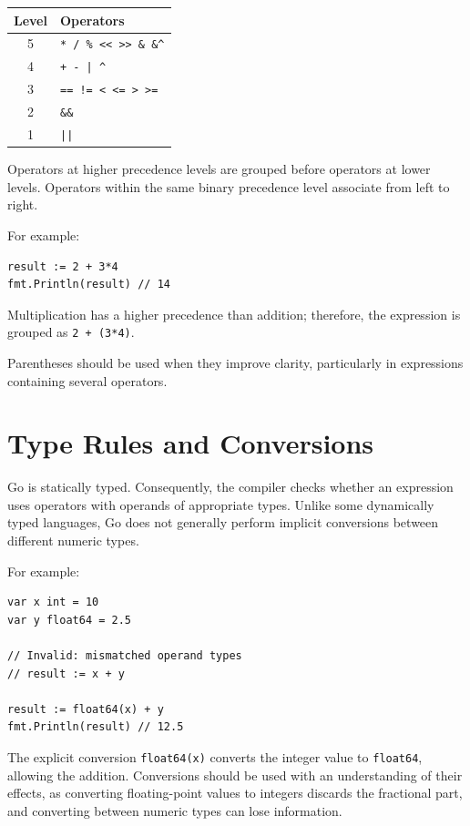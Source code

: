 \begin{center}
\begin{tabular}{|c|l|}
\hline
\textbf{Level} & \textbf{Operators} \\
\hline
5 & \texttt{* / \% << >> \& \&\^} \\
4 & \texttt{+ - | \^{}} \\
3 & \texttt{== != < <= > >=} \\
2 & \texttt{\&\&} \\
1 & \texttt{||} \\
\hline
\end{tabular}
\end{center}

Operators at higher precedence levels are grouped before
operators at lower levels. Operators within the same binary
precedence level associate from left to right.

For example:

\begin{lstlisting}
result := 2 + 3*4
fmt.Println(result) // 14
\end{lstlisting}

Multiplication has a higher precedence than addition;
therefore, the expression is grouped as
\texttt{2 + (3*4)}.

Parentheses should be used when they improve clarity,
particularly in expressions containing several operators.

\section{Type Rules and Conversions}

Go is statically typed. Consequently, the compiler checks
whether an expression uses operators with operands of
appropriate types. Unlike some dynamically typed languages,
Go does not generally perform implicit conversions between
different numeric types.

For example:

\begin{lstlisting}
var x int = 10
var y float64 = 2.5

// Invalid: mismatched operand types
// result := x + y

result := float64(x) + y
fmt.Println(result) // 12.5
\end{lstlisting}

The explicit conversion \texttt{float64(x)} converts the
integer value to \texttt{float64}, allowing the addition.
Conversions should be used with an understanding of their
effects, as converting floating-point values to integers
discards the fractional part, and converting between numeric
types can lose information.

